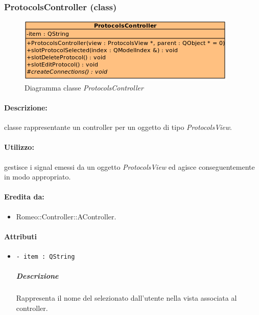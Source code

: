 	\subsubsection{ProtocolsController (class)}
	\begin{figure}[!h]
		\centering
		\includegraphics[width=0.6\linewidth]{./Content/Immagini/controller/ProtocolsController}
		\caption{Diagramma classe \textsl{ProtocolsController}}
	\end{figure}
	\paragraph{Descrizione:} classe rappresentante un controller per un oggetto di tipo \textsl{ProtocolsView}.
	\paragraph{Utilizzo:} gestisce i signal\g{} emessi da un oggetto \textsl{ProtocolsView} ed agisce conseguentemente in modo appropriato.
	\paragraph{Eredita da:}
		\begin{itemize}
			\item Romeo::Controller::AController.
		\end{itemize}
	\paragraph{Attributi}
		\begin{itemize}
			\item \color{teal} \verb!- item : QString!
			\color{black}
			\subparagraph{Descrizione} Rappresenta il nome del \protocol{} selezionato dall'utente nella vista associata al controller.
		\end{itemize}
